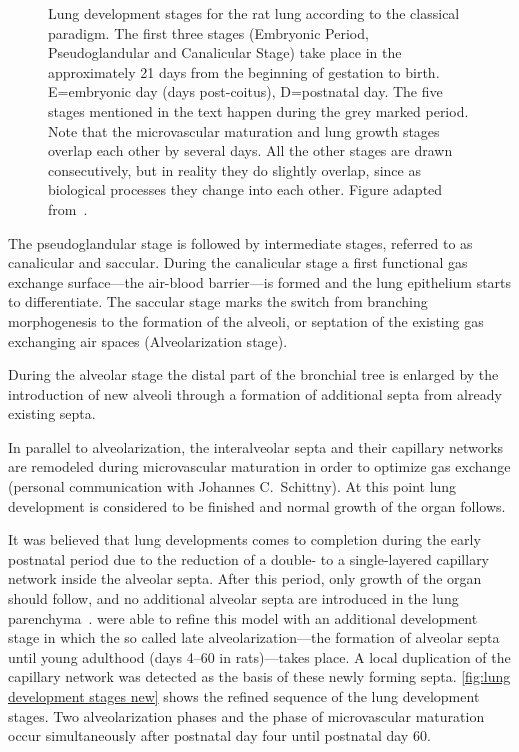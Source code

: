 \begin{figure}[htb]
	\noindent\makebox[\textwidth]{%
		\centering%
		}%
	\caption[Lung development stages, classical paradigm]{Lung development stages for the rat lung according to the classical paradigm. The first three stages (Embryonic Period, Pseudoglandular and Canalicular Stage) take place in the approximately 21 days from the beginning of gestation to birth. E=embryonic day (days post-coitus), D=postnatal day. The five stages mentioned in the text happen during the grey marked period. Note that the microvascular maturation and lung growth stages overlap each other by several days. All the other stages are drawn consecutively, but in reality they do slightly overlap, since as biological processes they change into each other. Figure adapted from~\cite{Schittny2007a}.}
	\label{fig:lung development stages old}
\end{figure}

The pseudoglandular stage is followed by intermediate stages, referred to as canalicular and saccular. During the canalicular stage a first functional gas exchange surface---the air-blood barrier---is formed and the lung epithelium starts to differentiate. The saccular stage marks the switch from branching morphogenesis to the formation of the alveoli, or septation of the existing gas exchanging air spaces (Alveolarization stage).

During the alveolar stage the distal part of the bronchial tree is enlarged by the introduction of new alveoli through a formation of additional septa from already existing septa. 

In parallel to alveolarization, the interalveolar septa and their capillary networks are remodeled during microvascular maturation in order to optimize gas exchange (personal communication with Johannes C.\ Schittny). At this point lung development is considered to be finished and normal growth of the organ follows.

It was believed that lung developments comes to completion during the early postnatal period due to the reduction of a double- to a single-layered capillary network inside the alveolar septa. After this period, only growth of the organ should follow, and no additional alveolar septa are introduced in the lung parenchyma~\cite{Burri1999,Schittny2004}. \citet{Schittny2008} were able to refine this model with an additional development stage in which the so called late alveolarization---the formation of alveolar septa until young adulthood (days 4--60 in rats)---takes place. A local duplication of the capillary network was detected as the basis of these newly forming septa. \autoref{fig:lung development stages new} shows the refined sequence of the lung development stages. Two alveolarization phases and the phase of microvascular maturation occur simultaneously after postnatal day four until postnatal day 60.


